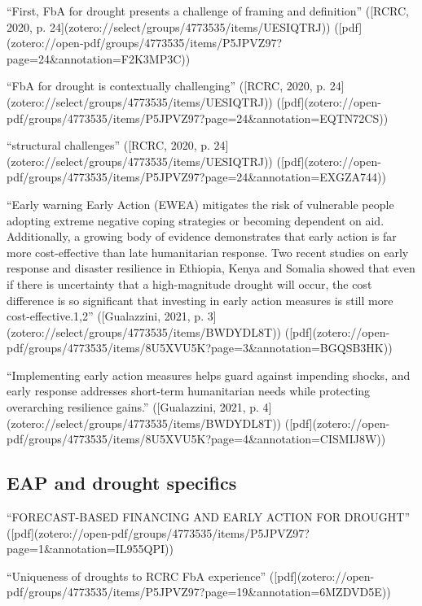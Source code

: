 {%
“First, FbA for drought presents a challenge of framing and definition” ([RCRC, 2020, p. 24](zotero://select/groups/4773535/items/UESIQTRJ)) ([pdf](zotero://open-pdf/groups/4773535/items/P5JPVZ97?page=24&annotation=F2K3MP3C))

“FbA for drought is contextually challenging” ([RCRC, 2020, p. 24](zotero://select/groups/4773535/items/UESIQTRJ)) ([pdf](zotero://open-pdf/groups/4773535/items/P5JPVZ97?page=24&annotation=EQTN72CS))

“structural challenges” ([RCRC, 2020, p. 24](zotero://select/groups/4773535/items/UESIQTRJ)) ([pdf](zotero://open-pdf/groups/4773535/items/P5JPVZ97?page=24&annotation=EXGZA744))

“Early warning Early Action (EWEA) mitigates the risk of vulnerable people adopting extreme negative coping strategies or becoming dependent on aid. Additionally, a growing body of evidence demonstrates that early action is far more cost-effective than late humanitarian response. Two recent studies on early response and disaster resilience in Ethiopia, Kenya and Somalia showed that even if there is uncertainty that a high-magnitude drought will occur, the cost difference is so significant that investing in early action measures is still more cost-effective.1,2” ([Gualazzini, 2021, p. 3](zotero://select/groups/4773535/items/BWDYDL8T)) ([pdf](zotero://open-pdf/groups/4773535/items/8U5XVU5K?page=3&annotation=BGQSB3HK))

“Implementing early action measures helps guard against impending shocks, and early response addresses short-term humanitarian needs while protecting overarching resilience gains.” ([Gualazzini, 2021, p. 4](zotero://select/groups/4773535/items/BWDYDL8T)) ([pdf](zotero://open-pdf/groups/4773535/items/8U5XVU5K?page=4&annotation=CISMIJ8W))



\subsection{EAP and drought specifics}
“FORECAST-BASED FINANCING AND EARLY ACTION FOR DROUGHT” ([pdf](zotero://open-pdf/groups/4773535/items/P5JPVZ97?page=1&annotation=IL955QPI))

“Uniqueness of droughts to RCRC FbA experience” ([pdf](zotero://open-pdf/groups/4773535/items/P5JPVZ97?page=19&annotation=6MZDVD5E))

}
